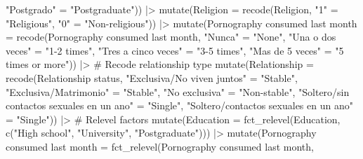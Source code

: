 \documentclass[
  bookmarksnumbered]{article}
\newenvironment{Shaded}{\begin{snugshade}}{\end{snugshade}}
\newcommand{\AttributeTok}[1]{\textcolor[rgb]{0.80,0.80,0.80}{#1}}
\newcommand{\CommentTok}[1]{\textcolor[rgb]{0.50,0.62,0.50}{#1}}
\newcommand{\FunctionTok}[1]{\textcolor[rgb]{0.94,0.94,0.56}{#1}}
\newcommand{\NormalTok}[1]{\textcolor[rgb]{0.80,0.80,0.80}{#1}}
\newcommand{\OtherTok}[1]{\textcolor[rgb]{0.94,0.94,0.56}{#1}}
\newcommand{\SpecialCharTok}[1]{\textcolor[rgb]{0.86,0.64,0.64}{#1}}
\newcommand{\StringTok}[1]{\textcolor[rgb]{0.80,0.58,0.58}{#1}}
\begin{document}
\begin{Shaded}
\begin{Highlighting}[]
                            \StringTok{"Postgrado"} \OtherTok{=} \StringTok{"Postgraduate"}\NormalTok{)) }\SpecialCharTok{|\textgreater{}}
  \FunctionTok{mutate}\NormalTok{(}\AttributeTok{Religion =} \FunctionTok{recode}\NormalTok{(Religion,}
                           \StringTok{"1"} \OtherTok{=} \StringTok{"Religious"}\NormalTok{,}
                           \StringTok{"0"} \OtherTok{=} \StringTok{"Non{-}religious"}\NormalTok{)) }\SpecialCharTok{|\textgreater{}}
  \FunctionTok{mutate}\NormalTok{(}\StringTok{\textasciigrave{}}\AttributeTok{Pornography consumed last month}\StringTok{\textasciigrave{}} \OtherTok{=} \FunctionTok{recode}\NormalTok{(}\StringTok{\textasciigrave{}}\AttributeTok{Pornography consumed last month}\StringTok{\textasciigrave{}}\NormalTok{,}
                                                    \StringTok{"Nunca"} \OtherTok{=} \StringTok{"None"}\NormalTok{,}
                                                    \StringTok{"Una o dos veces"} \OtherTok{=} \StringTok{"1{-}2 times"}\NormalTok{,}
                                                    \StringTok{"Tres a cinco veces"} \OtherTok{=} \StringTok{"3{-}5 times"}\NormalTok{,}
                                                    \StringTok{"Mas de 5 veces"} \OtherTok{=} \StringTok{"5 times or more"}\NormalTok{)) }\SpecialCharTok{|\textgreater{}} 
  \CommentTok{\# Recode relationship type}
  \FunctionTok{mutate}\NormalTok{(}\AttributeTok{Relationship =} \FunctionTok{recode}\NormalTok{(}\StringTok{\textasciigrave{}}\AttributeTok{Relationship status}\StringTok{\textasciigrave{}}\NormalTok{,}
                               \StringTok{"Exclusiva/No viven juntos"} \OtherTok{=} \StringTok{"Stable"}\NormalTok{,}
                               \StringTok{"Exclusiva/Matrimonio"} \OtherTok{=} \StringTok{"Stable"}\NormalTok{,}
                               \StringTok{"No exclusiva"} \OtherTok{=} \StringTok{"Non{-}stable"}\NormalTok{,}
                               \StringTok{"Soltero/sin contactos sexuales en un ano"} \OtherTok{=} \StringTok{"Single"}\NormalTok{,}
                               \StringTok{"Soltero/contactos sexuales en un ano"} \OtherTok{=} \StringTok{"Single"}\NormalTok{)) }\SpecialCharTok{|\textgreater{}}
  \CommentTok{\# Relevel factors}
  \FunctionTok{mutate}\NormalTok{(}\AttributeTok{Education =} \FunctionTok{fct\_relevel}\NormalTok{(Education, }
                                 \FunctionTok{c}\NormalTok{(}\StringTok{"High school"}\NormalTok{, }\StringTok{"University"}\NormalTok{, }\StringTok{"Postgraduate"}\NormalTok{))) }\SpecialCharTok{|\textgreater{}} 
  \FunctionTok{mutate}\NormalTok{(}\StringTok{\textasciigrave{}}\AttributeTok{Pornography consumed last month}\StringTok{\textasciigrave{}} \OtherTok{=} \FunctionTok{fct\_relevel}\NormalTok{(}\StringTok{\textasciigrave{}}\AttributeTok{Pornography consumed last month}\StringTok{\textasciigrave{}}\NormalTok{,}

\end{Highlighting}
\end{Shaded}
\end{document}
